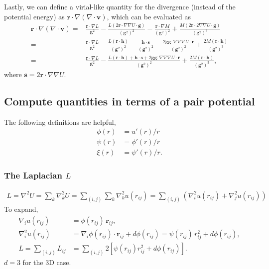\documentclass{article}
\begin{document}
Lastly, we can define a virial-like quantity for the divergence (instead of the potential energy) as 
$\mathbf r \cdot \nabla (\nabla \cdot \mathbf v)$, which can be evaluated as
\begin{align*}
\mathbf r \cdot \nabla (\nabla \cdot \mathbf v)
    = &  \frac { \mathbf r \cdot \nabla L }
              { \mathbf g^2 }
      - \frac { L (2 \mathbf r \cdot \nabla \nabla U \cdot \mathbf g) }
              { (\mathbf g^2)^2 }
     - \frac { \mathbf r \cdot \nabla M }
              { (\mathbf g^2)^2 } 
      + \frac { M (2 \mathbf r \cdot 2 \nabla \nabla U \cdot \mathbf g)}
              { (\mathbf g^2)^3 } 
\\
   = & \frac { \mathbf r \cdot \nabla L }
              { \mathbf g^2 }
      - \frac { L (\mathbf r \cdot \mathbf h) }
              { (\mathbf g^2)^2 }
     - \frac { \mathbf h \cdot \mathbf s }
              { (\mathbf g^2)^2 } 
      - \frac { 2 \mathbf g \mathbf g : \nabla \nabla \nabla U \cdot \mathbf r }
              { (\mathbf g^2)^2 } 
      + \frac { 2 M (\mathbf r \cdot \mathbf h)}
              { (\mathbf g^2)^3 } 
\\
   = & \frac { \mathbf r \cdot \nabla L }
              { \mathbf g^2 }
     - \frac { L (\mathbf r \cdot \mathbf h) + \mathbf h \cdot \mathbf s + 2 \mathbf g \mathbf g : \nabla \nabla \nabla U \cdot \mathbf r}
              { (\mathbf g^2)^2 }
      + \frac { 2 M (\mathbf r \cdot \mathbf h)}
              { (\mathbf g^2)^3 },
\end{align*}
where $\mathbf s = 2 \mathbf r \cdot \nabla \nabla U$.



\subsection{Compute quantities in terms of a pair potential}

The following definitions are helpful,
\begin{align*}
  \phi(r) & = u'(r)/r \\
  \psi(r) & = \phi'(r)/r \\
  \xi(r)  & = \psi'(r)/r.
\end{align*}



\subsubsection{The Laplacian $L$}
\begin{align*}
L = \nabla^2 U 
  = \sum_k \nabla_k^2 U
  = \sum_{(i, j)} \sum_k \nabla_k^2 u(r_{ij})
  = \sum_{(i, j)} (\nabla_i^2 u(r_{ij}) + \nabla_j^2 u(r_{ij}))
\end{align*}
To expand, 
\begin{align*}
\nabla_i u(r_{ij}) 
& = \phi(r_{ij}) \, \mathbf r_{ij}, \\
\nabla_i^2 u(r_{ij})
& = \nabla_i \phi(r_{ij}) \cdot \mathbf r_{ij} + d \phi(r_{ij})
= \psi(r_{ij}) \, r_{ij}^2  + d \phi(r_{ij}), \\
L = \sum_{(i, j)} L_{ij} & = \sum_{(i, j)} 2 [ \psi(r_{ij}) r_{ij}^2 + d \phi(r_{ij}) ].
\end{align*}
$d = 3$ for the 3D case.
\end{document}
